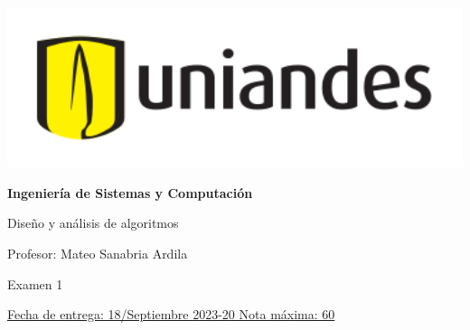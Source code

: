 \documentclass[12pt, a4paper]{exam}
\begin{document}
	\noindent
	\begin{minipage}[l]{0.1\textwidth}
		\noindent
		\includegraphics[width=1.8\textwidth]{Logosimbolo-uniandes_horizontal.png}
	\end{minipage}
\hfill
\begin{minipage}[c]{0.8\textwidth}
	\begin{center}
		{\large \textbf{Ingeniería de Sistemas y Computación} \par
		\large	Diseño y análisis de algoritmos	\par
		\small  Profesor: Mateo Sanabria Ardila	\par
		\small  Examen 1	\par
		}
	\end{center}
\end{minipage}
\par
\vspace{0.2in}
\noindent
\uline{Fecha de entrega: 18/Septiembre 	\hfill  2023-20		\hfill Nota máxima: 60}
\par 
\vspace{0.15in}
\end{document}
